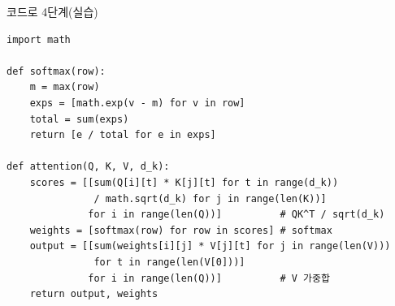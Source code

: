 \begin{frame}[fragile]{코드로 4단계}(실습)
\begin{lstlisting}
import math

def softmax(row):
    m = max(row)
    exps = [math.exp(v - m) for v in row]
    total = sum(exps)
    return [e / total for e in exps]

def attention(Q, K, V, d_k):
    scores = [[sum(Q[i][t] * K[j][t] for t in range(d_k))
               / math.sqrt(d_k) for j in range(len(K))]
              for i in range(len(Q))]          # QK^T / sqrt(d_k)
    weights = [softmax(row) for row in scores] # softmax
    output = [[sum(weights[i][j] * V[j][t] for j in range(len(V)))
               for t in range(len(V[0]))]
              for i in range(len(Q))]          # V 가중합
    return output, weights
\end{lstlisting}
  

\end{frame}
